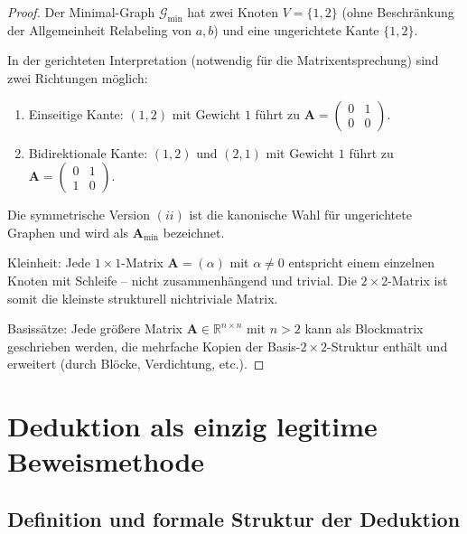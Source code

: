 \documentclass[12pt, a4paper]{article}
\theoremstyle{definition}
\theoremstyle{remark}
\newcommand{\R}{\mathbb{R}}
\newcommand{\vA}{\bm{A}}
\newcommand{\Graph}{\mathcal{G}}
\begin{document}
\begin{proof}
Der Minimal-Graph $\Graph_{\min}$ hat zwei Knoten $V = \{1, 2\}$ (ohne Beschränkung der Allgemeinheit Relabeling von $a, b$) und eine ungerichtete Kante $\{1, 2\}$.

In der gerichteten Interpretation (notwendig für die Matrixentsprechung) sind zwei Richtungen möglich:
\begin{enumerate}[label=(\roman*)]
  \item Einseitige Kante: $(1, 2)$ mit Gewicht $1$ führt zu $\vA = \begin{pmatrix} 0 & 1 \\ 0 & 0 \end{pmatrix}$.
  \item Bidirektionale Kante: $(1, 2)$ und $(2, 1)$ mit Gewicht $1$ führt zu $\vA = \begin{pmatrix} 0 & 1 \\ 1 & 0 \end{pmatrix}$.
\end{enumerate}

Die symmetrische Version $(ii)$ ist die kanonische Wahl für ungerichtete Graphen und wird als $\vA_{\min}$ bezeichnet.

Kleinheit: Jede $1 \times 1$-Matrix $\vA = (\alpha)$ mit $\alpha \neq 0$ entspricht einem einzelnen Knoten mit Schleife -- nicht zusammenhängend und trivial. Die $2 \times 2$-Matrix ist somit die kleinste strukturell nichtriviale Matrix.

Basissätze: Jede größere Matrix $\vA \in \R^{n \times n}$ mit $n > 2$ kann als Blockmatrix geschrieben werden, die mehrfache Kopien der Basis-$2 \times 2$-Struktur enthält und erweitert (durch Blöcke, Verdichtung, etc.).
\end{proof}

\section{Deduktion als einzig legitime Beweismethode}
\label{sec:deduktion}

\subsection{Definition und formale Struktur der Deduktion}
\label{subsec:deduktion_def}
\end{document}
